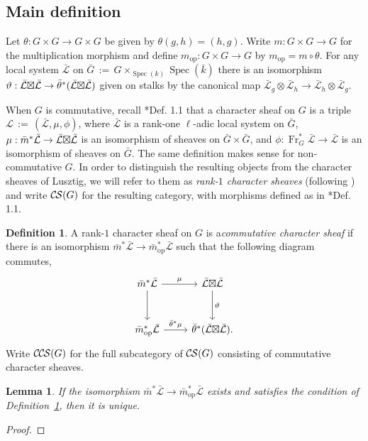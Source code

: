 \documentclass[10pt]{amsart}
\theoremstyle{plain}
\newtheorem{lemma}[theorem]{Lemma}
\theoremstyle{definition}
\newtheorem{definition}[theorem]{Definition}
\newcommand{\bFq}{\bar{k}}
\newcommand{\Fq}{k}
\newcommand{\Frob}[1]{\operatorname{Fr}_{#1}}
\newcommand{\Spec}[1]{{\operatorname{Spec}(#1)}}
\newcommand{\op}{_{\operatorname{op}}}
\newcommand{\ceq}{{\, :=\, }}
\newcommand{\cs}[1]{{\mathcal{#1}}}
\newcommand{\gcs}[1]{{\mathcal{\bar #1}}}
\newcommand{\CS}{{\mathcal{C\hskip-0.8pt S}}}
\newcommand{\CCS}{{\mathcal{C\hskip-.8pt C\hskip-0.8pt S}}}
\newcommand{\bm}{\bar{m}}
\newcommand{\bG}{\bar{G}}
\newcommand{\tight}[3]{\hspace{-#1pt}{#2}\hspace{-#3pt}}
\newcommand{\LxL}{\text{$\gcs{L} \tight{0}{\boxtimes}{0} \gcs{L}$}}
\begin{document}
\subsection{Main definition}

Let $\theta : G\times G \to G\times G$ be given by $\theta(g,h) = (h,g)$.
Write $m : G \times G \to G$ for the multiplication morphism
and define $m\op : G \times G \to G$ by $m\op = m \circ \theta$.
For any local system $\gcs{L}$ on $\bG \ceq G \times_{\Spec{\Fq}} \Spec{\bFq}$ there is an isomorphism
$\vartheta : \LxL \to {\bar \theta}^*(\LxL)$ given on stalks by the canonical map
$\gcs{L}_{g} \otimes \gcs{L}_{h} \to \gcs{L}_{h} \otimes \gcs{L}_{g}$.

When $G$ is commutative, recall \cite{cunningham-roe:13a}*{Def. 1.1} that a character sheaf on $G$ is a triple $\cs{L} \ceq (\gcs{L}, \mu, \phi)$,
where $\gcs{L}$ is a rank-one $\ell$-adic local system on $\bG$, $\mu : \bm^* \gcs{L} \to \LxL$ is an isomorphism
of sheaves on $\bG \times \bG$, and $\phi : \Frob{G}^* \gcs{L} \to \gcs{L}$ is an isomorphism of sheaves on $\bG$.
The same definition makes sense for non-commutative $G$.  In order to distinguish the resulting objects from
the character sheaves of Lusztig, we will refer to them as \emph{rank-$1$ character sheaves} (following \cite{Kamgarpour})
and write $\CS(G)$ for the resulting category, with morphisms defined as in \cite{cunningham-roe:13a}*{Def. 1.1}.

\begin{definition}\label{def:CCS}
A rank-$1$ character sheaf on $G$ is a\emph{commutative character sheaf} if there is an isomorphism ${\bar m}^* \gcs{L} \to {\bar m}\op^* \gcs{L}$ such that the following diagram commutes,
  \[
  \begin{tikzcd}[row sep=30]
   \bm^*\gcs{L} \arrow{d} \arrow{r}{\mu} & \LxL \arrow{d}{\vartheta}\\
   \bm\op^*\gcs{L} \arrow{r}{{\bar \theta}^*\mu} &  {\bar \theta}^*(\LxL).
  \end{tikzcd}
  \]
 Write $\CCS(G)$ for the full subcategory of $\CS(G)$ consisting of commutative character sheaves.
 \end{definition}


\begin{lemma}
If the isomorphism ${\bar m}^* \gcs{L} \to {\bar m}\op^* \gcs{L}$ exists and satisfies the condition of Definition~\ref{def:CCS}, then it is unique.
\end{lemma}
\begin{proof}
\end{proof}
\end{document}
